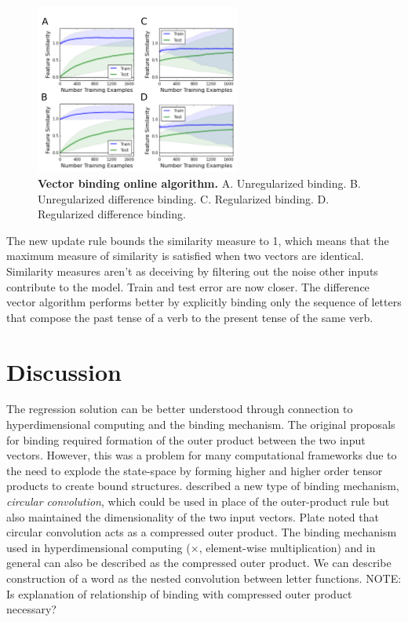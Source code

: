 \documentclass{article}
\begin{document}
\begin{figure}[h]
\centering
\includegraphics[width=0.6\textwidth]{vector_binding_algorithm-170518.png}
\caption{\textbf{Vector binding online algorithm.} A. Unregularized binding. B. Unregularized difference binding. C. Regularized binding. D. Regularized difference binding.}
\end{figure}

The new update rule bounds the similarity measure to 1, which means that the maximum measure of similarity is satisfied when two vectors are identical. Similarity measures aren't as deceiving by filtering out the noise other inputs contribute to the model. Train and test error are now closer. The difference vector algorithm performs better by explicitly binding only the sequence of letters that compose the past tense of a verb to the present tense of the same verb. 


\section{Discussion}
The regression solution can be better understood through connection to hyperdimensional computing and the binding mechanism. The original proposals for binding \citet{Smolensky1990} required formation of the outer product between the two input vectors. However, this was a problem for many computational frameworks due to the need to explode the state-space by forming higher and higher order tensor products to create bound structures. \citet{Plate1991} described a new type of binding mechanism, \emph{circular convolution}, which could be used in place of the outer-product rule but also maintained the dimensionality of the two input vectors. Plate noted that circular convolution acts as a compressed outer product. The binding mechanism used in hyperdimensional computing ($\times$, element-wise multiplication) and in general can also be described as the compressed outer product. We can describe construction of a word as the nested convolution between letter functions.
NOTE: Is explanation of relationship of binding with compressed outer product necessary? 
\end{document}
